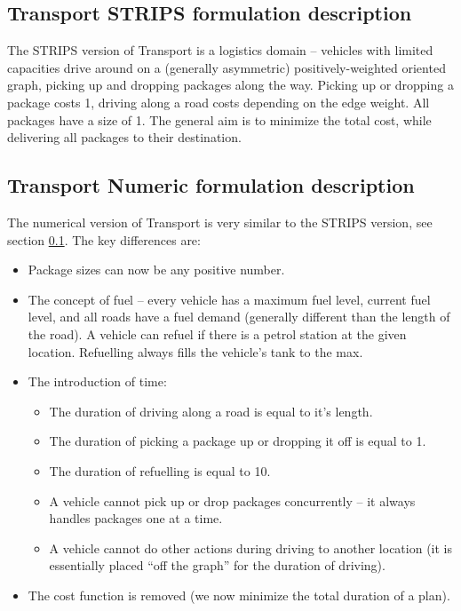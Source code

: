 \documentclass[10pt,a4paper,oneside]{article}
\begin{document}

\subsection{Transport STRIPS formulation description}\label{transport-strips}

The STRIPS version of Transport is a logistics domain -- vehicles with limited capacities drive around on a (generally asymmetric) positively-weighted oriented graph, picking up and dropping packages along the way. Picking up or dropping a package costs 1, driving along a road costs depending on the edge weight. All packages have a size of 1. The general aim is to minimize the total cost, while delivering all packages to their destination.

\subsection{Transport Numeric formulation description}\label{transport-numeric}

The numerical version of Transport is very similar to the STRIPS version, see section \ref{transport-strips}. The key differences are:
\begin{itemize}
\item Package sizes can now be any positive number.
\item The concept of fuel -- every vehicle has a maximum fuel level, current fuel level, and all roads have a fuel demand (generally different than the length of the road). A vehicle can refuel if there is a petrol station at the given location. Refuelling always fills the vehicle's tank to the max.
\item The introduction of time:
\begin{itemize}
\item The duration of driving along a road is equal to it's length.
\item The duration of picking a package up or dropping it off is equal to 1.
\item The duration of refuelling is equal to 10.
\item A vehicle cannot pick up or drop packages concurrently -- it always handles packages one at a time.
\item A vehicle cannot do other actions during driving to another location (it is essentially placed ``off the graph'' for the duration of driving).
\end{itemize}
\item The cost function is removed (we now minimize the total duration of a plan).
\end{itemize}
\end{document}
